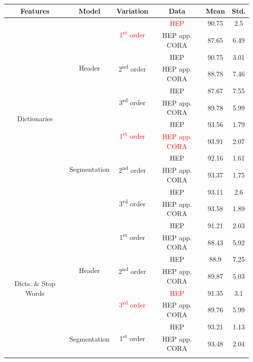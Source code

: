 \begin{table}[h]
\begin{center}
\begin{tabular}{|c|c|c|c|c|c|}
\hline
Features & Model & Variation & Data & Mean & Std.\\
\hline
\multirow{12}{*}{Dictionaries} & \multirow{6}{*}{Header} & \multirow{2}{*}{\textcolor{red}{1\textsuperscript{st} order}} & \textcolor{red}{HEP} & 90.75 & 2.5\\\cline{4-6}
& & & HEP app. CORA & 87.65 & 6.49\\\cline{3-6}
& & \multirow{2}{*}{2\textsuperscript{nd} order} & HEP & 90.75 & 3.01\\\cline{4-6}
& & & HEP app. CORA & 88.78 & 7.46\\\cline{3-6}
& & \multirow{2}{*}{3\textsuperscript{rd} order} & HEP & 87.67 & 7.55\\\cline{4-6}
& & & HEP app. CORA & 89.78 & 5.99\\\cline{2-6}
& \multirow{6}{*}{Segmentation} & \multirow{2}{*}{\textcolor{red}{1\textsuperscript{st} order}} & HEP & 93.56 & 1.79\\\cline{4-6}
& & & \textcolor{red}{HEP app. CORA} & 93.91 & 2.07\\\cline{3-6}
& & \multirow{2}{*}{2\textsuperscript{nd} order} & HEP & 92.16 & 1.61\\\cline{4-6}
& & & HEP app. CORA & 93.37 & 1.75\\\cline{3-6}
& & \multirow{2}{*}{3\textsuperscript{rd} order} & HEP & 93.11 & 2.6\\\cline{4-6}
& & & HEP app. CORA & 93.58 & 1.89\\
\hline
\multirow{12}{*}{Dicts. \& Stop Words} & \multirow{6}{*}{Header} & \multirow{2}{*}{1\textsuperscript{st} order} & HEP & 91.21 & 2.03\\\cline{4-6}
& & & HEP app. CORA & 88.43 & 5.92\\\cline{3-6}
& & \multirow{2}{*}{2\textsuperscript{nd} order} & HEP & 88.9 & 7.25\\\cline{4-6}
& & & HEP app. CORA & 89.87 & 5.03\\\cline{3-6}
& & \multirow{2}{*}{\textcolor{red}{3\textsuperscript{rd} order}} & \textcolor{red}{HEP} & 91.35 & 3.1\\\cline{4-6}
& & & HEP app. CORA & 89.76 & 5.99\\\cline{2-6}
& \multirow{6}{*}{Segmentation} & \multirow{2}{*}{1\textsuperscript{st} order} & HEP & 93.21 & 1.13\\\cline{4-6}
& & & HEP app. CORA & 93.48 & 2.04\\\cline{3-6}

\end{tabular}
\end{center}
\end{table}
